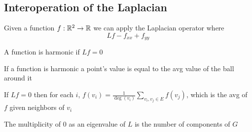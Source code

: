 
\subsection{Interoperation of the Laplacian}

\begin{definition}[harmonic]
    \label{def:harmonic}
    Given a function \(f: \mathbb{R}^2 \to \mathbb{R}\) we can apply the Laplacian operator where
    \[
        Lf - f_{x x} + f_{y y} 
    \]
    
    A function is harmonic if \(Lf = 0\) 
\end{definition}  

\begin{proposition}
    If a function is harmonic a point's value is equal to the avg value of the ball around it 
\end{proposition} 

If \(Lf = 0\) then for each \(i\), \(f(v_i) = \frac{1}{\deg (v_i)} \sum_{v_i, v_j \in E} f(v_j)\), which is the avg of \(f\) given neighbors of \(v_i\)

The multiplicity of \(0\) as an eigenvalue of \(L\) is the number of components of \(G\)

